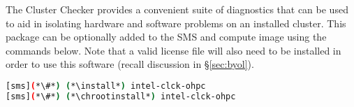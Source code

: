 The \IntelR{} Cluster Checker provides a convenient suite of diagnostics that
can be used to aid in isolating hardware and software problems on an installed
cluster. This package can be optionally added to the SMS and compute image
using the commands below. Note that a valid license file will also need to be
installed in order to use this software (recall discussion in \S\ref{sec:byol}).

\begin{lstlisting}[language=bash,keywords={}]
[sms](*\#*) (*\install*) intel-clck-ohpc
[sms](*\#*) (*\chrootinstall*) intel-clck-ohpc
\end{lstlisting}
